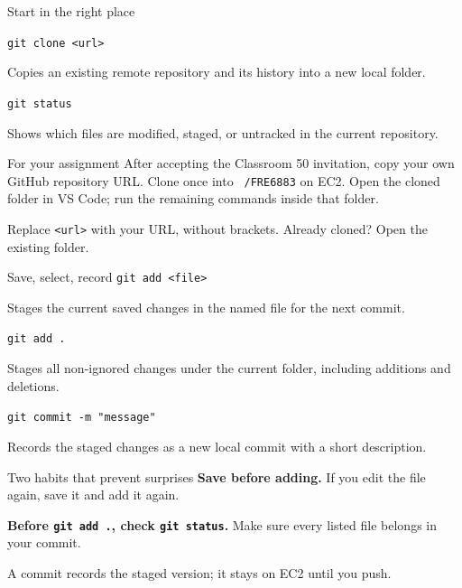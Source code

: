 \documentclass[10pt,aspectratio=169]{beamer}
\newcommand{\gitcmd}[1]{{\color{BootcampBlueDark}\texttt{#1}}}
\newcommand{\commandrow}[2]{%
  {\large\gitcmd{#1}}\par\smallskip
  #2\par\vspace{0.25em}
}
\begin{document}
\begin{frame}{Start in the right place}
  \begin{center}
  \end{center}
  \smallskip
  \commandrow{git clone <url>}{Copies an existing remote repository and its history into a new local folder.}
  \commandrow{git status}{Shows which files are modified, staged, or untracked in the current repository.}
  \begin{block}{For your assignment}
    \small
    After accepting the Classroom 50 invitation, copy your own GitHub repository URL.
    Clone once into \texttt{\string~/FRE6883} on EC2. Open the cloned folder in VS Code;
    run the remaining commands inside that folder.
  \end{block}
  {\small Replace \texttt{<url>} with your URL, without brackets.
  Already cloned? Open the existing folder.}
\end{frame}

\begin{frame}{Save, select, record}
  \commandrow{git add <file>}{Stages the current saved changes in the named file for the next commit.}
  \commandrow{git add .}{Stages all non-ignored changes under the current folder, including additions and deletions.}
  \commandrow{git commit -m "message"}{Records the staged changes as a new local commit with a short description.}
  \begin{alertblock}{Two habits that prevent surprises}
    \textbf{Save before adding.} If you edit the file again, save it and add it again.\par
    \smallskip
    \textbf{Before \gitcmd{git add .}, check \gitcmd{git status}.}
    Make sure every listed file belongs in your commit.
  \end{alertblock}
  {\small A commit records the staged version; it stays on EC2 until you push.}
\end{frame}
\end{document}
